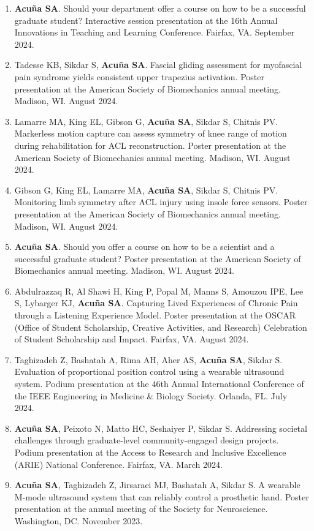 \documentclass[letterpaper, 10pt]{article}
\begin{document}
\begin{enumerate}
    \item \textbf{Acuña SA}. Should your department offer a course on how to be a successful graduate student? Interactive session presentation at the 16th Annual Innovations in Teaching and Learning Conference. Fairfax, VA. September 2024.
    \item Tadesse KB, Sikdar S, \textbf{Acuña SA}. Fascial gliding assessment for myofascial pain syndrome yields consistent upper trapezius activation. Poster presentation at the American Society of Biomechanics annual meeting. Madison, WI. August 2024.
    \item Lamarre MA, King EL, Gibson G, \textbf{Acuña SA}, Sikdar S, Chitnis PV. Markerless motion capture can assess symmetry of knee range of motion during rehabilitation for ACL reconstruction. Poster presentation at the American Society of Biomechanics annual meeting. Madison, WI. August 2024.
    \item Gibson G, King EL, Lamarre MA, \textbf{Acuña SA}, Sikdar S, Chitnis PV. Monitoring limb symmetry after ACL injury using insole force sensors. Poster presentation at the American Society of Biomechanics annual meeting. Madison, WI. August 2024. 
    \item \textbf{Acuña SA}. Should you offer a course on how to be a scientist and a successful graduate student? Poster presentation at the American Society of Biomechanics annual meeting. Madison, WI. August 2024.
    \item Abdulrazzaq R, Al Shawi H, King P, Popal M, Manns S, Amouzou IPE, Lee S, Lybarger KJ, \textbf{Acuña SA}. Capturing Lived Experiences of Chronic Pain through a Listening Experience Model. Poster presentation at the OSCAR (Office of Student Scholarship, Creative Activities, and Research) Celebration of Student Scholarship and Impact. Fairfax, VA. August 2024.
    \item Taghizadeh Z, Bashatah A, Rima AH, Aher AS, \textbf{Acuña SA}, Sikdar S. Evaluation of proportional position control using a wearable ultrasound system. Podium presentation at the 46th Annual International Conference of the IEEE Engineering in Medicine \& Biology Society. Orlanda, FL. July 2024.
    \item \textbf{Acuña SA}, Peixoto N, Matto HC, Seshaiyer P, Sikdar S. Addressing societal challenges through graduate-level community-engaged design projects. Podium presentation at the Access to Research and Inclusive Excellence (ARIE) National Conference. Fairfax, VA. March 2024.
    \item \textbf{Acuña SA}, Taghizadeh Z, Jirsaraei MJ, Bashatah A, Sikdar S. A wearable M-mode ultrasound system that can reliably control a prosthetic hand. Poster presentation at the annual meeting of the Society for Neuroscience. Washington, DC. November 2023.

\end{enumerate}
\end{document}
